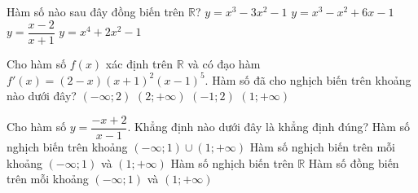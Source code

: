 \begin{ex}%
	Hàm số nào sau đây đồng  biến trên $\mathbb{R}$?
	\choice 
		 {$y=x^3-3 x^2-1$}
		{\True $y=x^3-x^2+6  x-1$}
		 {$y=\dfrac{x-2}{x+1}$}
		 {$y=x^4+2 x^2-1$}
\end{ex}

\begin{ex}%
	Cho hàm số $f(x)$ xác định trên $\mathbb{R}$ và có đạo hàm $f'(x)=(2-x)(x+1)^2(x-1)^5$. Hàm số đã cho nghịch biến trên khoảng  nào dưới đây?
	 \choice
		{$(-\infty;2)$} 
		{\True  $(2;+\infty)$}
		{$(-1;2)$} 
		 {$(1;+\infty)$}
\end{ex}

\begin{ex}%
	Cho hàm số $y=\dfrac{-x+2}{x-1}$. Khẳng định nào dưới đây là khẳng định đúng? 
	 \choice
		 {Hàm số nghịch biến trên khoảng $(-\infty;1) \cup(1;+\infty)$}
		{\True Hàm số nghịch biến trên mỗi khoảng  $(-\infty;1)$ và $(1;+\infty)$}
		{Hàm số nghịch biến  trên $\mathbb{R}$}
		{Hàm số đồng biến trên mỗi khoảng $(-\infty; 1)$ và  $(1;+\infty)$}
\end{ex}


